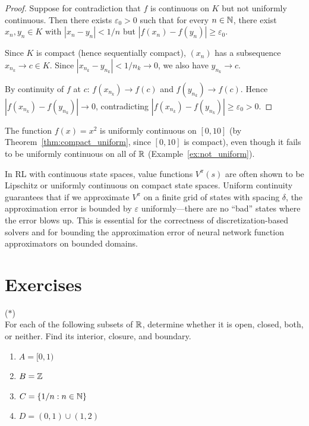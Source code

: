 \documentclass[11pt,a4paper]{article}
\begin{document}
\begin{proof}
Suppose for contradiction that $f$ is continuous on $K$ but not uniformly
continuous. Then there exists $\varepsilon_0 > 0$ such that for every
$n \in \mathbb{N}$, there exist $x_n, y_n \in K$ with $|x_n - y_n| < 1/n$ but
$|f(x_n) - f(y_n)| \ge \varepsilon_0$.

Since $K$ is compact (hence sequentially compact), $(x_n)$ has a
subsequence $x_{n_k} \to c \in K$. Since $|x_{n_k} - y_{n_k}| < 1/n_k
\to 0$, we also have $y_{n_k} \to c$.

By continuity of $f$ at $c$: $f(x_{n_k}) \to f(c)$ and
$f(y_{n_k}) \to f(c)$. Hence
$|f(x_{n_k}) - f(y_{n_k})| \to 0$,
contradicting $|f(x_{n_k}) - f(y_{n_k})| \ge \varepsilon_0 > 0$.
\end{proof}

\begin{example}
\label{ex:uniform_interval}
The function $f(x) = x^2$ is uniformly continuous on $[0, 10]$ (by
Theorem~\ref{thm:compact_uniform}, since $[0,10]$ is compact), even
though it fails to be uniformly continuous on all of $\mathbb{R}$
(Example~\ref{ex:not_uniform}).
\end{example}

\begin{rlconnection}[title={Uniform continuity in value function approximation}]
In RL with continuous state spaces, value functions $V^\pi(s)$ are often
shown to be Lipschitz or uniformly continuous on compact state spaces.
Uniform continuity guarantees that if we approximate $V^\pi$ on a finite
grid of states with spacing $\delta$, the approximation error is bounded
by $\varepsilon$ uniformly---there are no ``bad'' states where the error
blows up. This is essential for the correctness of discretization-based
solvers and for bounding the approximation error of neural network
function approximators on bounded domains.
\end{rlconnection}

\section{Exercises}
\label{sec:exercises}

\begin{exercise}
\textnormal{(\(*\))} \\
For each of the following subsets of $\mathbb{R}$, determine whether it is open,
closed, both, or neither. Find its interior, closure, and boundary.
\begin{enumerate}[nosep,label=(\alph*)]
  \item $A = [0, 1)$
  \item $B = \mathbb{Z}$
  \item $C = \{1/n : n \in \mathbb{N}\}$
  \item $D = (0, 1) \cup (1, 2)$
\end{enumerate}
\end{exercise}
\end{document}
